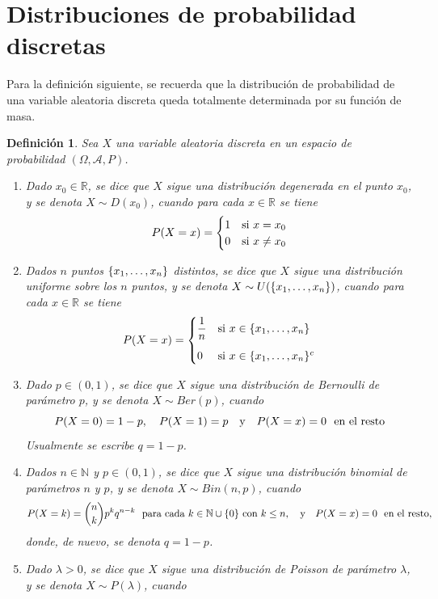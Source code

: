 \documentclass[11pt]{report}
\newtheorem{definition}{Definición}
\theoremstyle{definition}
\newcommand{\R}{\mathbb R}
\newcommand{\N}{\mathbb N}
\begin{document}
\section{Distribuciones de probabilidad discretas}
\label{A.8}

Para la definición siguiente, se recuerda que la distribución de probabilidad de una variable aleatoria discreta queda totalmente determinada por su función de masa.

\begin{definition}
Sea $X$ una variable aleatoria discreta en un espacio de probabilidad $(\Omega,\mathcal{A},P)$.
\begin{enumerate}
    \item Dado $x_0 \in \R$, se dice que $X$ sigue una \emph{distribución degenerada en el punto $x_0$}, y se denota $X \sim D(x_0)$, cuando para cada $x \in \R$ se tiene
    \[P(X = x) = \begin{cases}
        1 & $si$ \ x = x_0 \\
        0 & $si$ \ x \neq x_0
    \end{cases}\]
    \item Dados $n$ puntos $\{x_1,\mathellipsis,x_n\}$ distintos, se dice que $X$ sigue una \emph{distribución uniforme sobre los $n$ puntos}, y se denota $X \sim U(\{x_1,\mathellipsis,x_n\})$, cuando para cada $x \in \R$ se tiene
    \[P(X=x) = \begin{cases}
        \displaystyle\frac{1}{n} & $si$ \ x \in \{x_1,\mathellipsis,x_n\} \\[10pt]
        0 & $si$ \ x \in \{x_1,\mathellipsis,x_n\}^c
    \end{cases}\]
    \item Dado $p \in (0,1)$, se dice que $X$ sigue una \emph{distribución de Bernoulli de parámetro $p$}, y se denota $X \sim Ber(p)$, cuando
    \[P(X=0) = 1-p, \quad P(X=1) = p \quad \textup{y} \quad P(X = x)=0 \ \ \textup{en el resto}\]
    Usualmente se escribe $q = 1-p$.
    \item Dados $n \in \N$ y $p \in (0,1)$, se dice que $X$ sigue una \emph{distribución binomial de parámetros $n$ y $p$}, y se denota $X \sim Bin(n,p)$, cuando
    \[P(X=k)= \binom{n}{k}p^kq^{n-k} \ \ \textup{para cada } k \in \N \cup \{0\} \textup{ con }k \leq n, \quad \textup{y} \quad P(X = x)=0 \ \ \textup{en el resto},\]
    donde, de nuevo, se denota $q = 1-p$.
    \item Dado $\lambda > 0$, se dice que $X$ sigue una \emph{distribución de Poisson de parámetro $\lambda$}, y se denota $X \sim P(\lambda)$, cuando

\end{enumerate}
\end{definition}
\end{document}
